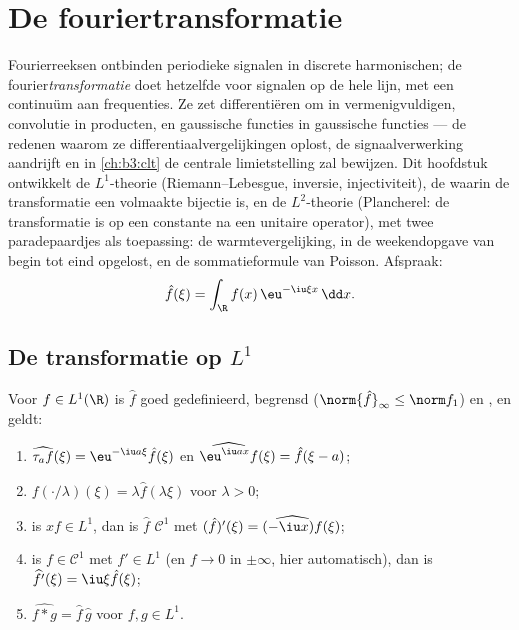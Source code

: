 \chapter{De fouriertransformatie}\label{ch:b3:fouriertransform}

Fourierreeksen ontbinden periodieke signalen in discrete
harmonischen; de fourier\emph{transformatie} doet hetzelfde voor
signalen op de hele lijn, met een continuüm aan frequenties. Ze
zet differentiëren om in vermenigvuldigen, convolutie in
producten, en gaussische functies in gaussische functies --- de
redenen waarom ze differentiaalvergelijkingen oplost, de
signaalverwerking aandrijft en in \cref{ch:b3:clt} de centrale
limietstelling zal bewijzen. Dit hoofdstuk ontwikkelt de
$L^1$-theorie (Riemann--Lebesgue, inversie, injectiviteit), de
 waarin de transformatie een volmaakte
bijectie is, en de $L^2$-theorie (Plancherel: de transformatie is
op een constante na een unitaire operator), met twee
paradepaardjes als toepassing: de warmtevergelijking, in de
weekendopgave van begin tot eind opgelost, en de sommatieformule
van Poisson. Afspraak:
\[
\hat f(\xi) = \int_\R f(x)\,\eu^{-\iu\xi x}\,\dd x .
\]

\section{De transformatie op \texorpdfstring{$L^1$}{L1}}

\begin{proposition}\label{prop:b3:fouriertransform:basic}
Voor $f \in L^1(\R)$ is $\hat f$ goed gedefinieerd, begrensd
($\norm{\hat f}_\infty \leq \norm f_1$) en , en geldt:
\begin{enumerate}
  \item $\widehat{\tau_af}(\xi) = \eu^{-\iu a\xi}\hat f(\xi)$ en
        $\widehat{\eu^{\iu ax}f}(\xi) = \hat f(\xi - a)$;
  \item $\widehat{f(\cdot/\lambda)}(\xi) = \lambda\hat
        f(\lambda\xi)$ voor $\lambda > 0$;
  \item is $xf \in L^1$, dan is $\hat f$ $\mathcal C^1$ met
        $(\hat f)'(\xi) = \widehat{(-\iu x)f}(\xi)$;
  \item is $f \in \mathcal C^1$ met $f' \in L^1$ (en $f \to 0$ in
        $\pm\infty$, hier automatisch), dan is
        $\widehat{f'}(\xi) = \iu\xi\hat f(\xi)$;
  \item $\widehat{f * g} = \hat f\,\hat g$ voor $f, g \in L^1$.
\end{enumerate}
\end{proposition}

